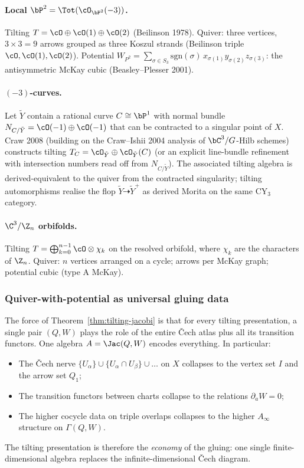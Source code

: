 \paragraph{Local $\bP^2 = \Tot(\cO_{\bP^2}(-3))$.} Tilting
$T = \cO \oplus \cO(1) \oplus \cO(2)$ (Beilinson 1978). Quiver: three
vertices, $3 \times 3 = 9$ arrows grouped as three Koszul strands (Beilinson
triple $\cO, \cO(1), \cO(2)$). Potential
$W_{P^2} = \sum_{\sigma \in S_3} \mathrm{sgn}(\sigma)\,
x_{\sigma(1)} y_{\sigma(2)} z_{\sigma(3)}$: the antisymmetric McKay cubic
(Beasley--Plesser 2001).

\paragraph{$(-3)$-curves.} Let $\tilde Y$ contain a rational curve $C \cong
\bP^1$ with normal bundle $N_{C/\tilde Y} = \cO(-1) \oplus \cO(-1)$ that can
be contracted to a singular point of $X$. Craw 2008 (building on the
Craw--Ishii 2004 analysis of $\bC^3/G$-Hilb schemes) constructs tilting
$T_C = \cO_{\tilde Y} \oplus \cO_{\tilde Y}(C)$ (or an explicit line-bundle
refinement with intersection numbers read off from $N_{C/\tilde Y}$). The
associated tilting algebra is derived-equivalent to the quiver from the
contracted singularity; tilting automorphisms realise the flop $\tilde Y
\dashrightarrow \tilde Y^+$ as derived Morita on the same CY$_3$ category.

\paragraph{$\C^3/\Z_n$ orbifolds.} Tilting
$T = \bigoplus_{k=0}^{n-1} \cO \otimes \chi_k$ on the resolved orbifold, where
$\chi_k$ are the characters of $\Z_n$. Quiver: $n$ vertices arranged on a
cycle; arrows per McKay graph; potential cubic (type A McKay).

\subsubsection{Quiver-with-potential as universal gluing data}

The force of Theorem~\ref{thm:tilting-jacobi} is that for every tilting
presentation, a single pair $(Q, W)$ plays the role of the entire \v{C}ech
atlas plus all its transition functors. One algebra $A = \Jac(Q, W)$ encodes
everything. In particular:
\begin{itemize}
\item The \v{C}ech nerve $\{U_\alpha\} \cup \{U_\alpha \cap U_\beta\} \cup \ldots$
 on $X$ collapses to the vertex set $I$ and the arrow set $Q_1$;
\item The transition functors between charts collapse to the relations
 $\partial_a W = 0$;
\item The higher cocycle data on triple overlaps collapses to the higher
 $A_\infty$ structure on $\Gamma(Q, W)$.
\end{itemize}
The tilting presentation is therefore the \emph{economy} of the gluing: one
single finite-dimensional algebra replaces the infinite-dimensional \v{C}ech
diagram.

